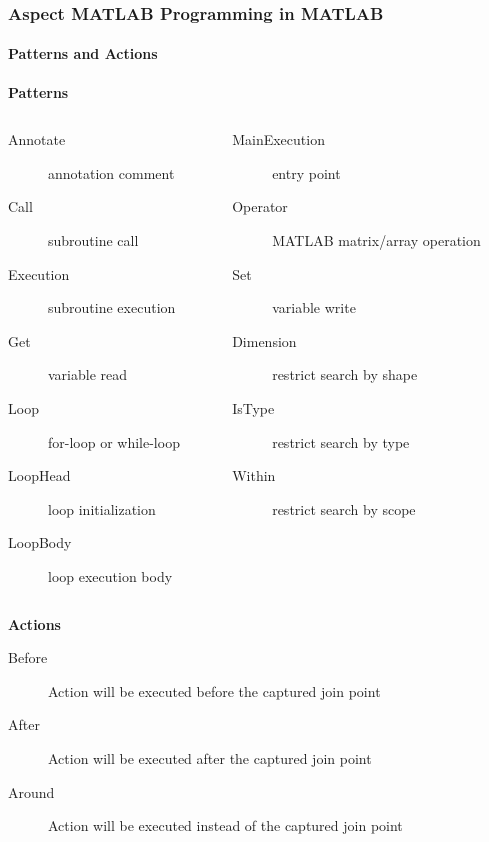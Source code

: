 \documentclass[10pt]{beamer}
\begin{document}
\begin{frame}
\frametitle{Aspect MATLAB Programming in MATLAB}
\framesubtitle{Patterns and Actions}
\textbf{Patterns}
\begin{columns}
    \begin{column}[T]{0.5\textwidth}
        \begin{description}
            \item [Annotate]       annotation comment
            \item [Call]           subroutine call
            \item [Execution]      subroutine execution
            \item [Get]            variable read
            \item [Loop]           for-loop or while-loop
            \item [LoopHead]       loop initialization
            \item [LoopBody]       loop execution body
        \end{description}    
    \end{column}
    \begin{column}[T]{0.5\textwidth}
        \begin{description}
            \item [MainExecution]  entry point
            \item [Operator]       MATLAB matrix/array operation
            \item [Set]            variable write
            \item [Dimension]      restrict search by shape
            \item [IsType]         restrict search by type
            \item [Within]         restrict search by scope
        \end{description}    
    \end{column}
\end{columns}

\textbf{Actions}
\begin{description}
    \item [Before]  Action will be executed before the captured join point
    \item [After]   Action will be executed after the captured join point
    \item [Around]  Action will be executed instead of the captured join point
\end{description}
\end{frame}
\end{document}
